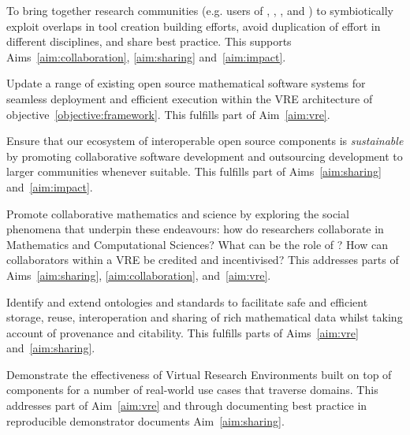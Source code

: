 \documentclass[noworkareas,deliverables,\classoptions]{euproposal}       %
\begin{document}
\begin{proposal}
\begin{compactenum}
\item \label{objective:community} To bring together research
  communities (e.g. users of \Jupyter, \Sage, \Singular, and \GAP) to
  symbiotically exploit overlaps in tool creation building efforts,
  avoid duplication of effort in different disciplines, and share best
  practice. This supports Aims~\ref{aim:collaboration},
  \ref{aim:sharing} and~\ref{aim:impact}.

\item \label{objective:updates} Update a range of existing open source
  mathematical software systems for seamless deployment and efficient
  execution within the VRE architecture of objective~\ref{objective:framework}.
  This fulfills part of Aim~\ref{aim:vre}.



\item \label{objective:sustainable} Ensure that our ecosystem of
  interoperable open source components is \emph{sustainable} by
  promoting collaborative software development and outsourcing
  development to larger communities whenever suitable. This fulfills
  part of Aims~\ref{aim:sharing} and~\ref{aim:impact}.

\item \label{objective:social} Promote collaborative mathematics and
  science by exploring the social phenomena that underpin these
  endeavours: how do researchers collaborate in Mathematics and
  Computational Sciences?  What can be the role of \VREs?  How can
  collaborators within a VRE be credited and incentivised? This
  addresses parts of Aims~\ref{aim:sharing}, \ref{aim:collaboration},
  and~\ref{aim:vre}.

\item \label{objective:data} Identify and extend ontologies and
  standards to facilitate safe and efficient storage, reuse,
  interoperation and sharing of rich mathematical data whilst taking
  account of provenance and citability. This fulfills parts of
  Aims~\ref{aim:vre} and~\ref{aim:sharing}.

\item \label{objective:demo} Demonstrate the effectiveness of Virtual
  Research Environments built on top of \TheProject components for a
  number of real-world use cases that traverse domains. This addresses
  part of Aim~\ref{aim:vre} and through documenting best practice in
  reproducible demonstrator documents Aim~\ref{aim:sharing}.


\end{compactenum}
\end{proposal}
\end{document}
